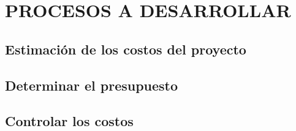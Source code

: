 \chapter{PROCESOS A DESARROLLAR}
%
\section{Estimaci\'on de los costos del proyecto}
\section{Determinar el presupuesto}
\section{Controlar los costos}